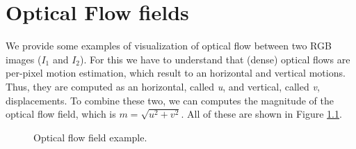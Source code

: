 \documentclass[12pt, a4paper]{report}
\begin{document}
	\chapter{Optical Flow fields}\label{appendix_c}
		We provide some examples of visualization of optical flow between two RGB images ($I_{1}$ and $I_{2}$).
		For this we have to understand that (dense) optical flows are per-pixel motion estimation, which result to an horizontal and vertical motions.
		Thus, they are computed as an horizontal, called {\itshape u}, and vertical, called {\itshape v}, displacements.
		To combine these two, we can computes the magnitude of the optical flow field, which is $m = \sqrt{u^{2} + v^{2}}$.
		All of these are shown in Figure \ref{optical_flow}.
		\begin{figure}[h!]
			\centering
			\hfill
			\vfill
			\hfill
			\vfill
			\caption{Optical flow field example.}\label{optical_flow}
		\end{figure}

	\makeutbmbackcover{}
\end{document}
